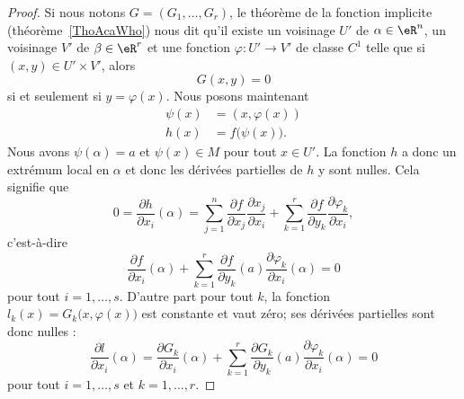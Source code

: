 \begin{proof}
	Si nous notons \( G=(G_1,\ldots, G_r)\), le théorème de la fonction implicite (théorème~\ref{ThoAcaWho})  nous dit qu'il existe un voisinage \( U'\) de \( \alpha\in \eR^n\), un voisinage \( V'\) de \( \beta\in \eR^r\) et une fonction \( \varphi\colon U'\to V'\) de classe \( C^1\) telle que si \( (x,y)\in U'\times V'\), alors
	\begin{equation}
		G(x,y)=0
	\end{equation}
	si et seulement si \( y=\varphi(x)\). Nous posons maintenant
	\begin{subequations}
		\begin{align}
			\psi(x) & =(x,\varphi(x))        \\
			h(x)    & =f\big( \psi(x) \big).
		\end{align}
	\end{subequations}
	Nous avons \( \psi(\alpha)=a\) et \( \psi(x)\in M\) pour tout \( x\in U'\). La fonction \( h\) a donc un extrémum local en \( \alpha\) et donc les dérivées partielles de \( h\) y sont nulles. Cela signifie que
	\begin{equation}
		0=\frac{ \partial h }{ \partial x_i }(\alpha)=\sum_{j=1}^n\frac{ \partial f }{ \partial x_j }\frac{ \partial x_j }{ \partial x_i }+\sum_{k=1}^r\frac{ \partial f }{ \partial y_k }\frac{ \partial \varphi_k }{ \partial x_i },
	\end{equation}
	c'est-à-dire
	\begin{equation}
		\frac{ \partial f }{ \partial x_i }(\alpha)+\sum_{k=1}^r\frac{ \partial f }{ \partial y_k }(a)\frac{ \partial \varphi_k }{ \partial x_i }(\alpha)=0
	\end{equation}
	pour tout \( i=1,\ldots, s\). D'autre part pour tout \( k\), la fonction \( l_k(x)=G_k\big( x,\varphi(x) \big)\) est constante et vaut zéro; ses dérivées partielles sont donc nulles :
	\begin{equation}
		\frac{ \partial l }{ \partial x_i }(\alpha)=\frac{ \partial G_k }{ \partial x_i }(\alpha)+\sum_{k=1}^r\frac{ \partial G_k }{ \partial y_k }(a)\frac{ \partial \varphi_k }{ \partial x_i }(\alpha)=0
	\end{equation}
	pour tout \( i=1,\ldots, s\) et \( k=1,\ldots, r\).


\end{proof}

